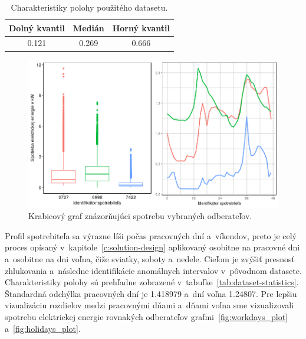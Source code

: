 \documentclass[a4paper,twoside,slovak,12pt,appendix]{article}
\begin{document}
\begin{table}[ht]
  \centering
  \caption{Charakteristiky polohy použitého datasetu.}
  \label{tab:quantile}
  \begin{tabular}{|c|c|c|}
    \hline
    \textbf{Dolný kvantil}  &   \textbf{Medián}		&		\textbf{Horný kvantil} \\ \hline
    0.121								    &   0.269							&		0.666					         \\ \hline
  \end{tabular}
\end{table}

\begin{figure}[htbp]
  \centering
  \includegraphics[width=\textwidth]{sample_plot.png}
  \caption{Krabicový graf znázorňujúci spotrebu vybraných odberateľov.}
  \label{fig:whole_plot}
\end{figure}

Profil spotrebiteľa sa výrazne líši počas pracovných dní a~víkendov, preto je
celý proces opísaný v~kapitole~\ref{c:solution-design} aplikovaný osobitne na
pracovné dni a~osobitne na dni voľna, čiže sviatky, soboty a~nedele. Cieľom je
zvýšiť presnosť zhlukovania a~následne identifikácie anomálnych intervalov
v~pôvodnom datasete. Charakteristiky polohy sú prehľadne zobrazené
v~tabuľke~\ref{tab:dataset-statistics}. Štandardná odchýlka pracovných dní je
1.418979 a~dní voľna 1.24807. Pre lepšiu vizualizáciu rozdielov medzi pracovnými
dňami a~dňami voľna sme vizualizovali spotrebu elektrickej energie rovnakých
odberateľov grafmi~\ref{fig:workdays_plot} a~\ref{fig:holidays_plot}.
\end{document}
